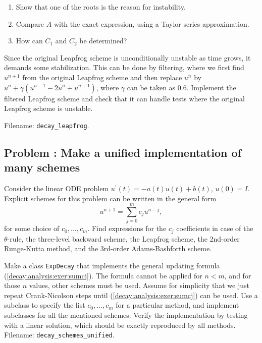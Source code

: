 \documentclass[graybox,sectrefs,envcountresetchap,open=right,final]{svmonodo}
\newenvironment{doconceexercise}{}{}
\newcounter{doconceexercisecounter}
\begin{document}
\begin{doconceexercise}
\begin{enumerate}
\item Show that one of the roots is the reason for instability.

\item Compare $A$ with the exact expression, using a Taylor series approximation.

\item How can $C_1$ and $C_2$ be determined?
\end{enumerate}

\noindent
{}
Since the original Leapfrog scheme is unconditionally unstable as time
grows, it demands some stabilization.  This can be done by filtering,
where we first find $u^{n+1}$ from the original Leapfrog scheme and
then replace $u^{n}$ by $u^n + \gamma (u^{n-1} - 2u^n +
u^{n+1})$, where $\gamma$ can be taken as 0.6.  Implement the filtered
Leapfrog scheme and check that it can handle tests where the original
Leapfrog scheme is unstable.


\noindent Filename: \Verb!decay_leapfrog!.

\end{doconceexercise}




\begin{doconceexercise}

\subsection*{Problem \thedoconceexercisecounter: Make a unified implementation of many schemes}

\label{decay:fd2:exer:uni}

Consider the linear ODE problem $u^{\prime}(t)=-a(t)u(t) + b(t)$, $u(0)=I$.
Explicit schemes for this problem can be written in the general form
\begin{equation}
u^{n+1} = \sum_{j=0}^m c_ju^{n-j},
\label{decay:analysis:exer:sumcj}
\end{equation}
for some choice of $c_0,\ldots,c_m$.
Find expressions for the $c_j$ coefficients in case of the
$\theta$-rule, the three-level backward scheme,
the Leapfrog scheme, the 2nd-order Runge-Kutta method,
and the 3rd-order Adams-Bashforth scheme.

Make a class \texttt{ExpDecay} that implements the
general updating formula (\ref{decay:analysis:exer:sumcj}).
The formula cannot be applied for $n < m$, and for those $n$ values, other
schemes must be used. Assume for simplicity that we just
repeat Crank-Nicolson steps until (\ref{decay:analysis:exer:sumcj}) can be used.
Use a subclass
to specify the list $c_0,\ldots,c_m$ for a particular method, and
implement subclasses for all the mentioned schemes.
Verify the implementation by testing with a linear solution, which should
be exactly reproduced by all methods.
\noindent Filename: \Verb!decay_schemes_unified!.

\end{doconceexercise}
\end{document}
